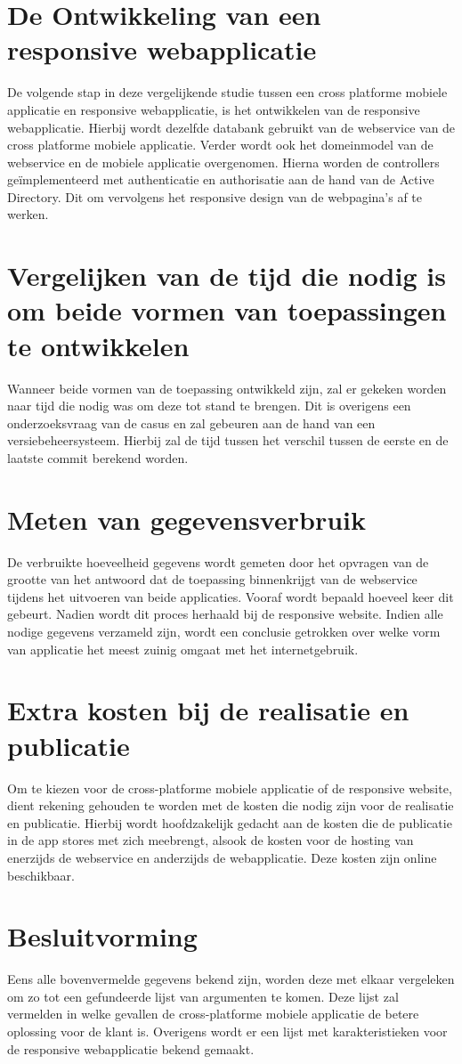 \section{De Ontwikkeling van een responsive webapplicatie}
De volgende stap in deze vergelijkende studie tussen een cross platforme mobiele applicatie en responsive webapplicatie, is het
ontwikkelen van de responsive webapplicatie. Hierbij wordt dezelfde databank gebruikt van de webservice van de cross platforme
mobiele applicatie. Verder wordt ook het domeinmodel van de webservice en de mobiele applicatie overgenomen. Hierna worden de controllers
geïmplementeerd met authenticatie en authorisatie aan de hand van de Active Directory.
Dit om vervolgens het responsive design van de webpagina's af te werken.

\section{Vergelijken van de tijd die nodig is om beide vormen van toepassingen te ontwikkelen}
Wanneer beide vormen van de toepassing ontwikkeld zijn, zal er gekeken worden naar tijd die nodig was om deze tot stand te brengen.
Dit is overigens een onderzoeksvraag van de casus en zal gebeuren aan de hand van een versiebeheersysteem.
Hierbij zal de tijd tussen het verschil tussen de eerste en de laatste commit berekend worden.

\section{Meten van gegevensverbruik}
De verbruikte hoeveelheid gegevens wordt gemeten door het opvragen van de grootte van het antwoord dat de toepassing binnenkrijgt van de webservice tijdens het uitvoeren van beide
applicaties. Vooraf wordt bepaald hoeveel keer dit gebeurt.
Nadien wordt dit proces herhaald bij de responsive website. Indien alle nodige gegevens verzameld zijn, wordt een conclusie
getrokken over welke vorm van applicatie het meest zuinig omgaat met het internetgebruik.

\section{Extra kosten bij de realisatie en publicatie}
Om te kiezen voor de cross-platforme mobiele applicatie of de responsive website, dient rekening gehouden te worden met de kosten die nodig zijn voor de realisatie en publicatie.
Hierbij wordt hoofdzakelijk gedacht aan de kosten die de publicatie in de app stores met zich meebrengt, alsook de kosten voor de hosting van enerzijds de webservice en
anderzijds de webapplicatie. Deze kosten zijn online beschikbaar.

\section{Besluitvorming}
Eens alle bovenvermelde gegevens bekend zijn, worden deze met elkaar vergeleken om zo tot een gefundeerde lijst van argumenten
te komen. Deze lijst zal vermelden in welke gevallen de cross-platforme mobiele applicatie de betere oplossing voor de klant is.
Overigens wordt er een lijst met karakteristieken voor de responsive webapplicatie bekend gemaakt.
